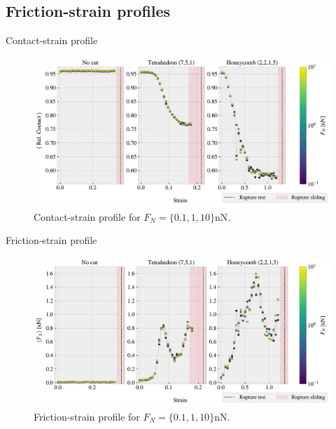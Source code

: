 \documentclass[
	10pt, %
]{beamer}
\begin{document}
\subsection{Friction-strain profiles}
\begin{frame}{Contact-strain profile}

	\begin{figure}[H]
		\centering
		\includegraphics[width=1\linewidth]{../thesis/figures/baseline/multi_stretch_area_compare.pdf}
		\caption{Contact-strain profile for $F_N = \{0.1, 1, 10\} \text{nN}$.}
	\end{figure}
\end{frame}
%
%
\begin{frame}{Friction-strain profile}
	\begin{figure}[H]
		\centering
		\includegraphics[width=1\linewidth]{../thesis/figures/baseline/multi_stretch_mean_compare.pdf}
		\caption{Friction-strain profile for $F_N = \{0.1, 1, 10\} \text{nN}$.}
	\end{figure}
\end{frame}
%
%
\end{document}
